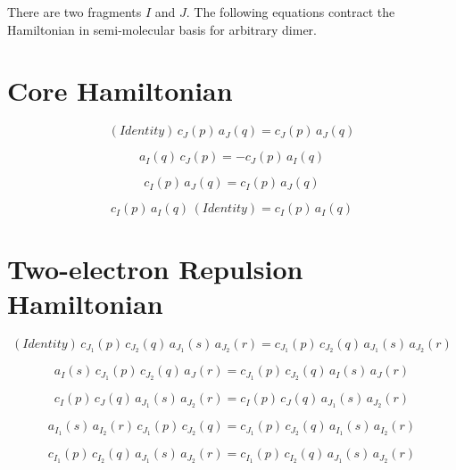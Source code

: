 \documentclass[12pt]{article}
\numberwithin{equation}{section}
\begin{document}
There are two fragments $I$ and $J$. The following equations contract the Hamiltonian in semi-molecular basis for arbitrary dimer. 

\section{Core Hamiltonian}

\begin{equation}
(Identity) \,  c_J(p) \, a_J(q) = c_J(p) \, a_J(q)
\end{equation}

\begin{equation}
a_I(q) \, c_J(p) = - c_J(p) \, a_I(q)
\end{equation}

\begin{equation}
c_I(p) \, a_J(q) = c_I(p) \, a_J(q)
\end{equation}

\begin{equation}
c_I(p) \, a_I(q) \, (Identity) = c_I(p) \, a_I(q)
\end{equation}

\section{Two-electron Repulsion Hamiltonian}

\begin{equation}
(Identity) \, c_{J_1}(p)  \, c_{J_2}(q)  \, a_{J_1}(s)  \, a_{J_2}(r) = c_{J_1}(p)  \, c_{J_2}(q)  \, a_{J_1}(s)  \, a_{J_2}(r) 
\end{equation}

\begin{equation}
a_{I}(s) \, c_{J_1}(p) \, c_{J_2}(q) \, a_{J}(r) = c_{J_1}(p) \, c_{J_2}(q) \, a_{I}(s) \, a_{J}(r)
\end{equation}

\begin{equation}
c_{I}(p) \, c_{J}(q) \, a_{J_1}(s) \, a_{J_2}(r) = c_{I}(p) \, c_{J}(q) \, a_{J_1}(s) \, a_{J_2}(r)
\end{equation}

\begin{equation}
a_{I_1}(s) \, a_{I_2}(r) \, c_{J_1}(p) \, c_{J_2}(q) =  c_{J_1}(p) \, c_{J_2}(q) \, a_{I_1}(s) \, a_{I_2}(r)
\end{equation}

\begin{equation}
c_{I_1}(p) \, c_{I_2}(q) \, a_{J_1}(s) \, a_{J_2}(r) = c_{I_1}(p) \, c_{I_2}(q) \, a_{J_1}(s) \, a_{J_2}(r)
\end{equation}
\end{document}
